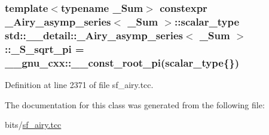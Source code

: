 \subsubsection[{\texorpdfstring{\+\_\+\+S\+\_\+sqrt\+\_\+pi}{_S_sqrt_pi}}]{\setlength{\rightskip}{0pt plus 5cm}template$<$typename \+\_\+\+Sum$>$ constexpr {\bf \+\_\+\+Airy\+\_\+asymp\+\_\+series}$<$ \+\_\+\+Sum $>$\+::{\bf scalar\+\_\+type} {\bf std\+::\+\_\+\+\_\+detail\+::\+\_\+\+Airy\+\_\+asymp\+\_\+series}$<$ \+\_\+\+Sum $>$\+::\+\_\+\+S\+\_\+sqrt\+\_\+pi = \+\_\+\+\_\+gnu\+\_\+cxx\+::\+\_\+\+\_\+const\+\_\+root\+\_\+pi({\bf scalar\+\_\+type}\{\})\hspace{0.3cm}{\ttfamily [static]}}\hypertarget{classstd_1_1____detail_1_1__Airy__asymp__series_a0a4d017f86429e22f5939e689e7b93ca}{}\label{classstd_1_1____detail_1_1__Airy__asymp__series_a0a4d017f86429e22f5939e689e7b93ca}


Definition at line 2371 of file sf\+\_\+airy.\+tcc.



The documentation for this class was generated from the following file\+:\begin{DoxyCompactItemize}
\item 
bits/\hyperlink{sf__airy_8tcc}{sf\+\_\+airy.\+tcc}\end{DoxyCompactItemize}
